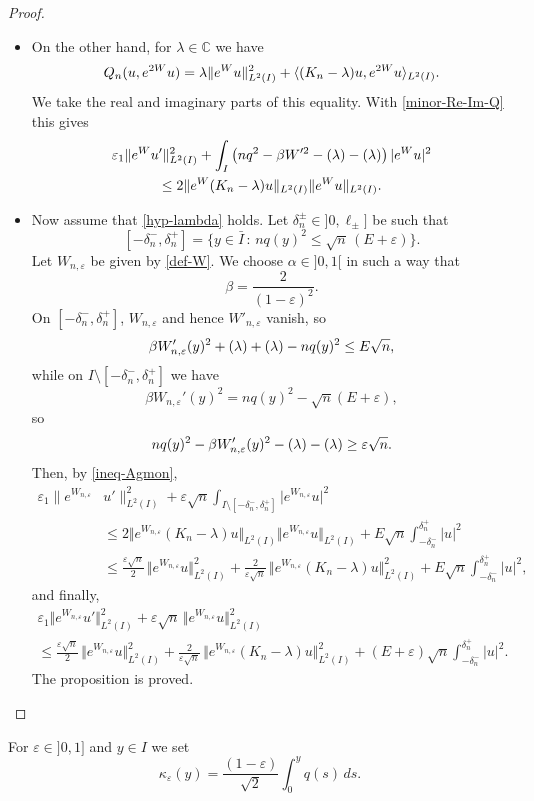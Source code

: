 \documentclass[11pt]{article}
\numberwithin{equation}{section}
\theoremstyle{plain}
\theoremstyle{definition}
\newcommand{\abs}[1]{\vert #1\vert}
\newcommand{\nr}[1]{\Vert #1\Vert}
\newcommand{\bnr}[1]{\bigl\Vert #1\bigr\Vert}
\newcommand{\set}[1]{\{ #1\}}
\newcommand{\1}{\mathds 1}
\newcommand{\st}{\,:\,}
\let\Re\relax
\DeclareMathOperator{\Re}{\mathsf{Re}\mkern2mu}
\let\Im\relax
\DeclareMathOperator{\Im}{\mathsf{Im}\mkern2mu}
\def\C{\mathbb{C}}
\let\b\beta
\let\d\delta
\let\e\varepsilon
\let\l\lambda
\begin{document}
\begin{proof}
\begin{itemize}
\item
On the other hand, for $\l \in \C$ we have
\[
Q_n (u,e^{2W}u) = \l \nr{e^W u}^2_{L^2(I)} + \innp{(K_n-\l)u}{e^{2W}u}_{L^2(I)}.
\]
We take the real and imaginary parts of this equality. With \eqref{minor-Re-Im-Q} this gives
\begin{multline} \label{ineq-Agmon}
\e_1 \nr{e^{W}u'}^2_{L^2(I)} + \int_{I} \left(nq^2 - \beta W'^2 - \Re(\l) - \Im(\l) \right) |e^W u|^2 \\
\leq 2 \nr{e^W (K_n-\l)u}_{L^2(I)} \nr{e^W u}_{L^2(I)}.
\end{multline}

\item
Now assume that \eqref{hyp-lambda} holds. Let $\d_n^\pm \in{}]0, \ell_\pm]$ be such that
\[
[-\d_n^-,\d_n^+] = \set{y \in \bar I \st nq(y)^2 \leq \sqrt{n}\,(E+\e)}.
\]
Let $W_{n,\e}$ be given by \eqref{def-W}. We choose $\alpha \in{}]0,1[$ in such a way that
\[
\beta = \frac {2}{(1-\e)^2}.
\]
On $[-\d_n^-,\d_n^+]$, $W_{n,\e}$ and hence $W'_{n,\e}$ vanish, so
\[
\beta W_{n,\e}'(y)^2 + \Re(\l) + \Im(\l) - nq(y)^2 \leq E \sqrt n,
\]
while on $I \setminus [-\d_n^-,\d_n^+]$ we have
\[
\b W_{n,\e}'(y)^2 = nq(y)^2 - \sqrt{n}(E+\e),
\]
so
\[
n q(y)^2 - \beta W_{n,\e}'(y)^2 - \Re(\l) - \Im(\l) \geq \e \sqrt n.
\]
Then, by \eqref{ineq-Agmon},
\begin{align*}
\e_1 \bigl\|e^{W_{n,\e}} &u'\bigr\|^2_{L^2(I)} + \e \sqrt n \int_{I \setminus [-\d_n^-,\d_n^+]} \abs{e^{W_{n,\e}} u}^2\\
& \leq 2 \bnr{e^{W_{n,\e}} (K_n-\l)u}_{L^2(I)} \bnr{e^{W_{n,\e}} u}_{L^2(I)} + E \sqrt n \int_{-\d_n^-}^{\d_n^+} \abs{u}^2\\
& \leq \frac {\e \sqrt n}2\, \bnr{e^{W_{n,\e}} u}^2_{L^2(I)} + \frac {2}{\e \sqrt n}\, \bnr{e^{W_{n,\e}} (K_n-\l)u}^2_{L^2(I)} + E \sqrt n \int_{-\d_n^-}^{\d_n^+} \abs{u}^2,
\end{align*}
and finally,
\begin{multline*}
\e_1 \bnr{e^{W_{n,\e}} u'}^2_{L^2(I)} + \e \sqrt n\,\bnr{e^{W_{n,\e}} u}^2_{L^2(I)}\\
\leq \frac {\e \sqrt n}{2}\, \bnr{e^{W_{n,\e}} u}^2_{L^2(I)} + \frac {2}{\e \sqrt n}\, \bnr{e^{W_{n,\e}} (K_n-\l)u}^2_{L^2(I)} + (E+\e) \sqrt n \int_{-\d_n^-}^{\d_n^+} \abs{u}^2.
\end{multline*}
The proposition is proved.\qedhere
\end{itemize}
\end{proof}

For $\e \in{}]0,1]$ and $y \in I$ we set
\[
\kappa_\e(y) = \frac {(1-\e)} {\sqrt 2} \int_0^y q(s) \, ds.
\]
\end{document}
